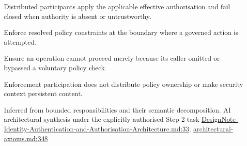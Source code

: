 Distributed participants apply the applicable effective authorisation and fail closed when authority is absent or untrustworthy.



Enforce resolved policy constraints at the boundary where a governed action is attempted.



Ensure an operation cannot proceed merely because its caller omitted or bypassed a voluntary policy check.



Enforcement participation does not distribute policy ownership or make security context persistent content.


Inferred from bounded responsibilities and their semantic decomposition. AI architectural synthesis under the explicitly authorised Step 2 task \hyperref[evidence:13afd583ac468df7]{DesignNote-Identity-Authentication-and-Authorisation-Architecture.md:33}; \hyperref[evidence:27549d51551beae6]{architectural-axioms.md:348}
